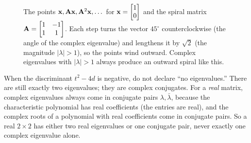 \begin{figure}[H]
\centering
{}
\caption{The points $\mathbf{x},\mathbf{A}\mathbf{x},\mathbf{A}^2\mathbf{x},\dots$ for
$\mathbf{x}=\protect\begin{bmatrix}1\\0\end{bmatrix}$ and
the spiral matrix $\mathbf{A}=\protect\begin{bmatrix}1&-1\\1&1\protect\end{bmatrix}$.
Each step turns the vector $45^\circ$ counterclockwise (the angle of the complex
eigenvalue) and lengthens it by $\sqrt2$ (the magnitude $|\lambda|>1$), so the
points wind outward. Complex eigenvalues with $|\lambda|>1$ always produce an
outward spiral like this.}
\label{ch23:fig-spiral}
\end{figure}

\begin{trapbox}
When the discriminant $t^2-4d$ is negative, do not declare ``no eigenvalues.''
There are still exactly two eigenvalues; they are complex conjugates. For a
\emph{real} matrix, complex eigenvalues always come in conjugate pairs
$\lambda,\bar\lambda$, because the characteristic polynomial has real coefficients
(the entries are real), and the complex roots of a polynomial with real
coefficients come in conjugate pairs. So a real
$2\times 2$ has either two real eigenvalues or one conjugate pair, never exactly
one complex eigenvalue alone.
\end{trapbox}

